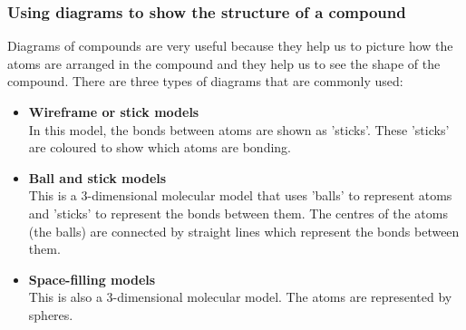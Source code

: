 \label{m38120*uid4}\subsubsection*{Using diagrams to show the structure of a compound}
Diagrams of compounds are very useful because they help us to picture how the atoms are arranged in the compound and they help us to see the shape of the compound. There are three types of diagrams that are commonly used:
\label{m38120*id307860}\begin{itemize}[noitemsep]
\item \textbf{Wireframe or stick models} \\
In this model, the bonds between atoms are shown as 'sticks'. These 'sticks' are coloured to show which atoms are bonding.
\item \textbf{Ball and stick models} \\
This is a 3-dimensional molecular model that uses 'balls' to represent atoms and 'sticks' to represent the bonds between them. The centres of the atoms (the balls) are connected by straight lines which represent the bonds between them.
\item \textbf{Space-filling models} \\
This is also a 3-dimensional molecular model. The atoms are represented by spheres.
\end{itemize}

